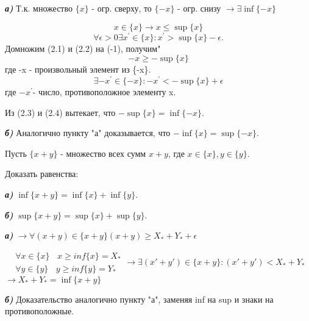 \documentclass[10pt]{article}
\begin{document}
\begin{solution}

\emph{\textbf{а)}} Т.к. множество $\{x\}$ - огр. сверху, то $\{-x\}$ - огр. снизу $\rightarrow \exists \inf \{-x\}$

\begin{equation}
x\in \{x\} \rightarrow x \leq \sup \{x\}
\end{equation}
\begin{equation}
\forall \epsilon >0 \exists x^{'} \in \{x\}: x^{'}>\sup\{x\}-\epsilon.
\end{equation}
Домножим (2.1) и (2.2) на (-1), получим"
\begin{equation}
-x \geq -\sup\{x\}
\end{equation}
 где -x - произвольный элемент из \{-x\}.
\begin{equation}
\exists -x^{'} \in \{-x\}: -x^{'} < -\sup\{x\}+\epsilon
\end{equation}
где $-x^{'}$- число, противоположное элементу x.

Из (2.3) и (2.4) вытекает, что $-\sup\{x\}=\inf\{-x\}$.

\emph{\textbf{б)}} Аналогично пункту "а" доказывается, что $-\inf\{x\}=\sup\{-x\}$.

\end{solution}



\begin{problem}
Пусть $\{x+y\}$ - множество всех сумм $x+y$, где $x \in \{x\},y\in\{y\}$.

Доказать равенства:

\emph{\textbf{а)}} $\inf\{x+y\}=\inf\{x\}+\inf\{y\}$.

\emph{\textbf{б)}} $\sup \{x+y\}=\sup\{x\}+\sup\{y\}$.
\end{problem}

\begin{solution}

\emph{\textbf{а)}} $\rightarrow \forall(x+y)\in\{x+y\} (x+y)\geq X_* + Y_* + \epsilon$



\begin{equation}
\begin{gathered} 
\forall x \in \{x\} ~~~~  x\geq inf\{x\}=X_*\\
\forall y \in \{y\} ~~~~  y\geq inf\{y\}=Y_*
\end{gathered} 
\rightarrow \exists(x'+y')\in\{x+y\}: (x'+y')< X_* + Y_*
\end{equation}
$ \rightarrow X_* + Y_* = \inf\{x+y\}$

\emph{\textbf{б)}} Доказательство аналогично пункту "а", заменяя inf на sup и знаки на противоположные.

\end{solution}
\end{document}
